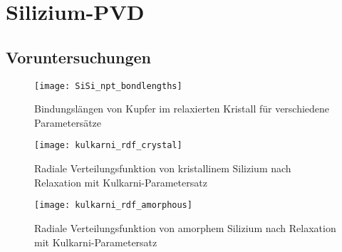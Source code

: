 \chapter{Silizium-PVD}
\label{appendix:silicon}

\section{Voruntersuchungen}

\begin{figure}
  \centering
  \texttt{[image: SiSi\_npt\_bondlengths]}
  \caption[Bindungslängen von Kupfer im relaxierten Kristall für verschiedene Parametersätze]{Bindungslängen von Kupfer im relaxierten Kristall für verschiedene Parametersätze}
  \label{fig:sisibondlengths}
\end{figure}

\begin{figure}
  \centering
  \texttt{[image: kulkarni\_rdf\_crystal]}
  \caption[Radiale Verteilungsfunktion von kristallinem Silizium nach Relaxation mit Kulkarni-Parametersatz]{Radiale Verteilungsfunktion von kristallinem Silizium nach Relaxation mit Kulkarni-Parametersatz}
  \label{fig:kulkarnirdf}
\end{figure}

\begin{figure}
  \centering
  \texttt{[image: kulkarni\_rdf\_amorphous]}
  \caption[Radiale Verteilungsfunktion von amorphem Silizium nach Relaxation mit Kulkarni-Parametersatz]{Radiale Verteilungsfunktion von amorphem Silizium nach Relaxation mit Kulkarni-Parametersatz}
  \label{fig:amorphousrdf}
\end{figure}

